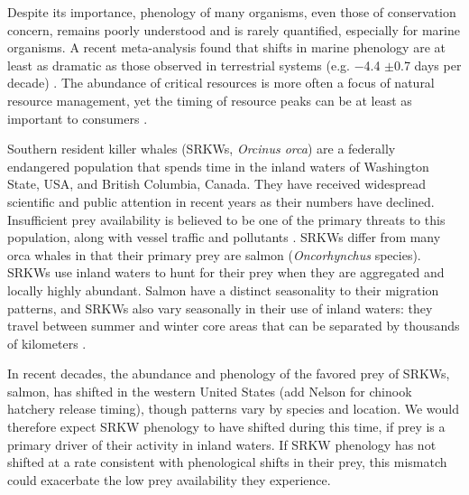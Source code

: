 \documentclass{article}
\begin{document}
\par Despite its importance, phenology of many organisms, even those of conservation concern, remains poorly understood and is rarely quantified, especially for marine organisms. A recent meta-analysis found that shifts in marine phenology are at least as dramatic as those observed in terrestrial systems (e.g. −4.4 $\pm$0.7 days per decade) \citep{poloczanska2013}. The abundance of critical resources is more often a focus of natural resource management, yet the timing of resource peaks can be at least as important to consumers \citep{hipfner2008}.
\par Southern resident killer whales (SRKWs, \emph{Orcinus orca}) are a federally endangered population that spends time in the inland waters of Washington State, USA, and British Columbia, Canada.  They have received widespread scientific and public attention in recent years as their numbers have declined\citep[e.g., Seattle Times articles,][]{lusseau2009,larson2018, olson2018}. Insufficient prey availability is believed to be one of the primary threats to this population, along with vessel traffic and pollutants \citep{krahn2007,lusseau2009,hanson2010}. SRKWs differ from many orca whales in that their primary prey are salmon (\emph{Oncorhynchus} species). SRKWs use inland waters to hunt for their prey when they are aggregated and locally highly abundant. Salmon have a distinct seasonality to their migration patterns,  and SRKWs also vary seasonally in their use of inland waters: they travel between summer and winter core areas that can be separated by thousands of kilometers \citep{balcomb1986,krahn2004}. 
\par In recent decades, the abundance and phenology of the favored prey of SRKWs, salmon, has shifted in the western United States \citep{weinheimer2017,reed2011,ford2006,satterthwaite2014}(add Nelson for chinook hatchery release timing), though patterns vary by species and location. We would therefore expect SRKW phenology to have shifted during this time, if prey is a primary driver of their activity in inland waters. If SRKW phenology has not shifted at a rate consistent with phenological shifts in their prey, this mismatch could exacerbate the low prey availability they experience. 
\end{document}
